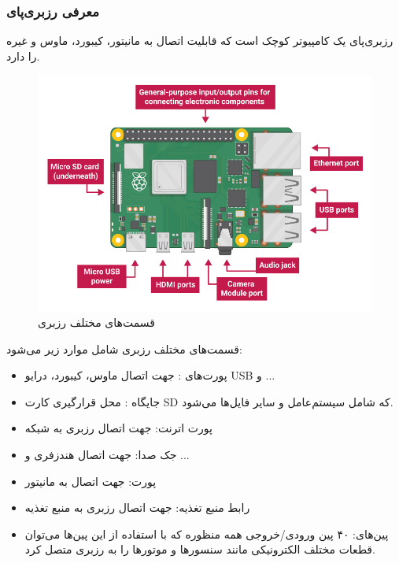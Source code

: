 \documentclass[12pt]{article}
\begin{document}
\subsubsection{معرفی رزبری‌پای }

رزبری‌پای یک کامپیوتر کوچک است که قابلیت اتصال به مانیتور، کیبورد، ماوس و غیره را دارد.

\begin{figure}[h]
	\begin{center}
		\includegraphics[width=.70\textwidth]{pi-labelled-names} %
	\end{center}
	\caption{قسمت‌های مختلف رزبری \cite{1}}
\end{figure}



قسمت‌های مختلف رزبری شامل موارد زیر می‌شود:

\begin{itemize}
	\item 
	پورت‌های :  جهت اتصال ماوس، کیبورد، درایو USB و ...
	\item 
	
	جایگاه : محل قرارگیری کارت SD که شامل سیستم‌عامل و سایر فایل‌ها می‌شود.
	\item 
	
	پورت اترنت: جهت اتصال رزبری به شبکه
	
	\item 
	جک صدا: جهت اتصال هندزفری و ...
	\item 
	
	پورت:  جهت اتصال به مانیتور
	\item 
رابط منبع تغذیه: جهت اتصال رزبری به منبع تغذیه
	
	\item
	پین‌های: 
	 ۴۰ پین ورودی/خروجی همه منظوره که با استفاده از این پین‌ها می‌توان قطعات مختلف الکترونیکی مانند سنسورها و موتورها را به رزبری متصل کرد. \cite{2}
\end{itemize}
\end{document}
